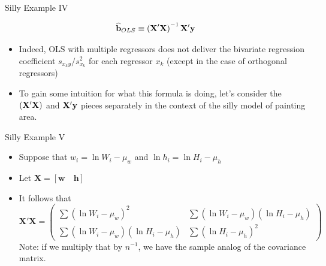 \documentclass[english,xcolor={dvipsnames},aspectratio=169]{beamer}
\begin{document}
\begin{frame}{Silly Example IV}

	\[
	\widehat{{\bf b}}_{OLS} \equiv  \left({\bf X}'{\bf X}\right)^{-1} {\bf X}' {\bf y} 
	\]


	\begin{itemize}
	\item Indeed, OLS with multiple regressors does not deliver 
	the bivariate regression coefficient $s_{x_{k}y}/s_{x_{k}}^{2}$ for each regressor $x_{k}$
	(except in the case of orthogonal regressors)

	\bigskip
	\item To gain some intuition for what this formula is doing, let's consider the $ \left({\bf X}'{\bf X}\right)$
	and ${\bf X}' {\bf y} $ pieces separately in the context of the silly model of painting area.


\end{itemize}
\end{frame}






\begin{frame}{Silly Example V}


	\begin{itemize}
	\item Suppose that $w_{i}=\ln W_{i}-\mu_{w}$ and $\ln h_{i}=\ln H_{i}-\mu_{h}$


	\item Let $\boldsymbol{X}=\left[\boldsymbol{w}\quad\boldsymbol{h}\right]$

	\item It follows that 
\[
\boldsymbol{X}'\boldsymbol{X}=\left(\begin{array}{cc}
\sum\left(\ln W_{i}-\mu_{w}\right)^{2} & \sum\left(\ln W_{i}-\mu_{w}\right)\left(\ln H_{i}-\mu_{h}\right)\\
\sum\left(\ln W_{i}-\mu_{w}\right)\left(\ln H_{i}-\mu_{h}\right) & \sum\left(\ln H_{i}-\mu_{h}\right)^{2}
\end{array}\right)
\]
Note: if we multiply that by $n^{-1}$, we have the sample analog of the
covariance matrix. 
	
\end{itemize}
\end{frame}
\end{document}
